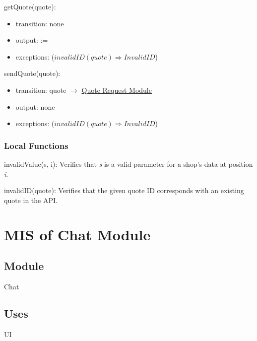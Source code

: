 \documentclass[12pt, titlepage]{article}
\begin{document}
\noindent getQuote(quote):
\begin{itemize}
\item transition: none
\item output:  := 
\item exceptions: ($invalidID(quote) \Rightarrow InvalidID$)
\end{itemize}

\noindent sendQuote(quote):
\begin{itemize}
\item transition: quote $\rightarrow$ \hyperref[mQuoteRequest]{Quote Request Module}
\item output: none
\item exceptions: ($invalidID(quote) \Rightarrow InvalidID$)
\end{itemize}

\subsubsection{Local Functions}

\noindent invalidValue(s, i): Verifies that \textit{s} is a valid parameter for a shop's data at position \textit{i}.

\noindent invalidID(quote): Verifies that the given quote ID corresponds with an existing quote in the API.

\newpage

\section{MIS of Chat Module} \label{mChat} 



\subsection{Module}

Chat


\subsection{Uses}

UI
\end{document}
